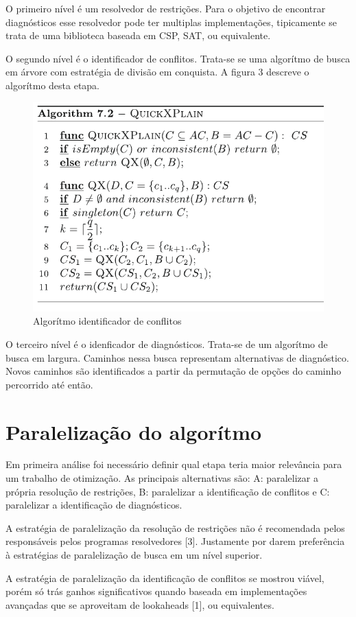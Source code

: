 \documentclass[conference]{IEEEtran}
\begin{document}
O primeiro nível é um resolvedor de restrições. Para o objetivo de encontrar diagnósticos esse resolvedor pode ter multiplas implementações, tipicamente se trata de uma biblioteca baseada em CSP, SAT, ou equivalente.

O segundo nível é o identificador de conflitos. Trata-se se uma algorítmo de busca em árvore com estratégia de divisão em conquista. A figura 3 descreve o algorítmo desta etapa.

\begin{figure}[htbp]
\centerline{\includegraphics[width=0.7\columnwidth]{qx.png}}
\caption{Algorítmo identificador de conflitos} 
\label{fig}
\end{figure}

O terceiro nível é o idenficador de diagnósticos. Trata-se de um algorítmo de busca em largura. Caminhos nessa busca representam alternativas de diagnóstico. Novos caminhos são identificados a partir da permutação de opções do caminho percorrido até então.

\section{Paralelização do algorítmo}

Em primeira análise foi necessário definir qual etapa teria maior relevância para um trabalho de otimização. As principais alternativas são: A: paralelizar a própria resolução de restrições, B: paralelizar a identificação de conflitos e C: paralelizar a identificação de diagnósticos. 

A estratégia de paralelização da resolução de restrições não é recomendada pelos responsáveis pelos programas resolvedores [3]. Justamente por darem preferência à estratégias de paralelização de busca em um nível superior.

A estratégia de paralelização da identificação de conflitos se mostrou viável, porém só trás ganhos significativos quando baseada em implementações avançadas que se aproveitam de lookaheads [1], ou equivalentes. 
\end{document}
